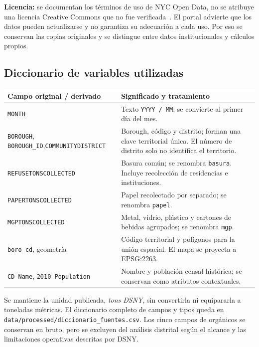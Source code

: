 \documentclass[10pt,a4paper]{article}
\newcommand{\archivo}[1]{\nolinkurl{#1}}
\begin{document}
\textbf{Licencia:} se documentan los términos de uso de NYC Open Data, no se atribuye una licencia Creative Commons que no fue verificada~\cite{terms}. El portal advierte que los datos pueden actualizarse y no garantiza su adecuación a cada uso. Por eso se conservan las copias originales y se distingue entre datos institucionales y cálculos propios.

\subsection{Diccionario de variables utilizadas}
\begin{center}\small
\begin{tabularx}{\linewidth}{@{}p{4.5cm}Y@{}}
\toprule
\textbf{Campo original / derivado} & \textbf{Significado y tratamiento} \\\midrule
\archivo{MONTH} & Texto \archivo{YYYY / MM}; se convierte al primer día del mes. \\
\archivo{BOROUGH}, \archivo{BOROUGH_ID},\newline\archivo{COMMUNITYDISTRICT} & Borough, código y distrito; forman una clave territorial única. El número de distrito solo no identifica el territorio. \\
\archivo{REFUSETONSCOLLECTED} & Basura común; se renombra \archivo{basura}. Incluye recolección de residencias e instituciones. \\
\archivo{PAPERTONSCOLLECTED} & Papel recolectado por separado; se renombra \archivo{papel}. \\
\archivo{MGPTONSCOLLECTED} & Metal, vidrio, plástico y cartones de bebidas agrupados; se renombra \archivo{mgp}. \\
\archivo{boro_cd}, geometría & Código territorial y polígonos para la unión espacial. El mapa se proyecta a EPSG:2263. \\
\texttt{CD Name}, \texttt{2010 Population} & Nombre y población censal histórica; se conservan como atributos contextuales. \\
\bottomrule
\end{tabularx}\end{center}
Se mantiene la unidad publicada, \textit{tons DSNY}, sin convertirla ni equipararla a toneladas métricas. El diccionario completo de campos y tipos queda en \archivo{data/processed/diccionario_fuentes.csv}. Los cinco campos de orgánicos se conservan en bruto, pero se excluyen del análisis distrital según el alcance y las limitaciones operativas descritas por DSNY.
\end{document}
